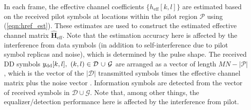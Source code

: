 In each frame, the  effective channel coefficients $\{h_{\mathrm{eff}}[k,l]\}$ are estimated based on the received pilot symbols at locations within the pilot region ${\mathcal{P}}$ using (\ref{eqn:href_est}). These estimates are used to construct the estimated effective channel matrix $\hat{\mathbf{H}}_{\text{eff}}$. Note that the estimation accuracy here is affected by the interference from data symbols (in addition to self-interference due to pilot symbol replicas and noise), which is determined by the pulse shape. The received DD symbols $y_{\mathrm{dd}}[k,l],\ (k,l)\in \mathcal{D} \hspace{0.5mm} \cup  \hspace{0.5mm} \mathcal{G}$ are arranged as a vector of length $MN-|\mathcal{P}|$, which is the vector of the $|\mathcal{D}|$ transmitted symbols times the effective channel matrix plus the noise vector \cite{zak_otfs7}. Information symbols are detected from the vector of received symbols in $\mathcal{D} \cup \mathcal{G}$. Note that, among other things, the equalizer/detection performance here is affected by the interference from pilot. 
